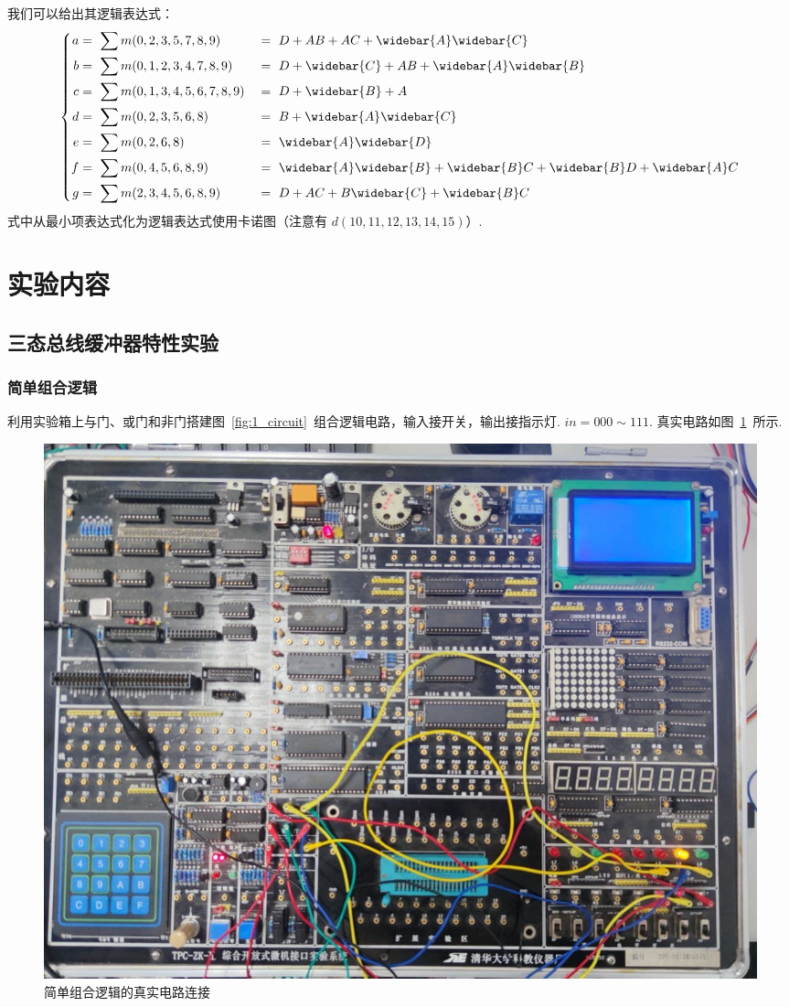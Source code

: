 \documentclass[11pt]{SEU-Digital-Report}
\begin{document}
            我们可以给出其逻辑表达式：
            \begin{equation}\label{eq:CD4511_logic}
                \left\{
                    \begin{aligned}
                        a & =\ \sum m(0, 2, 3, 5, 7, 8, 9) &&=\ D+AB+AC+\widebar{A}\widebar{C} \\
                        b & =\ \sum m(0, 1, 2, 3, 4, 7, 8, 9) &&=\ D+\widebar{C}+AB+\widebar{A}\widebar{B} \\
                        c & =\ \sum m(0, 1, 3, 4, 5, 6, 7, 8, 9) &&=\ D+\widebar{B}+A \\
                        d & =\ \sum m(0, 2, 3, 5, 6, 8) &&=\ B+\widebar{A}\widebar{C} \\
                        e & =\ \sum m(0, 2, 6, 8) &&=\ \widebar{A}\widebar{D} \\
                        f & =\ \sum m(0, 4, 5, 6, 8, 9) &&=\ \widebar{A}\widebar{B}+\widebar{B}C+\widebar{B}D+\widebar{A}C \\
                        g & =\ \sum m(2, 3, 4, 5, 6, 8, 9) &&=\ D+AC+B\widebar{C}+\widebar{B}C \\
                    \end{aligned}
                \right.
            \end{equation}
            式中从最小项表达式化为逻辑表达式使用卡诺图（注意有 $d(10,11,12,13,14,15)$）.
        
    \section{实验内容}\label{sec:exp}

        \subsection{三态总线缓冲器特性实验}

            \subsubsection{简单组合逻辑}

                利用实验箱上与门、或门和非门搭建图~\ref{fig:1_circuit}~组合逻辑电路，输入接开关，输出接指示灯.
                $in=000\sim 111$.
                真实电路如图~\ref{fig:1_real}~所示.

                \begin{figure}[htbp]
                    \centering
                    \includegraphics[width=.5\linewidth]{fig/简单组合逻辑真实.jpg}
                    \caption{简单组合逻辑的真实电路连接}
                    \label{fig:1_real}
                \end{figure}
\end{document}

